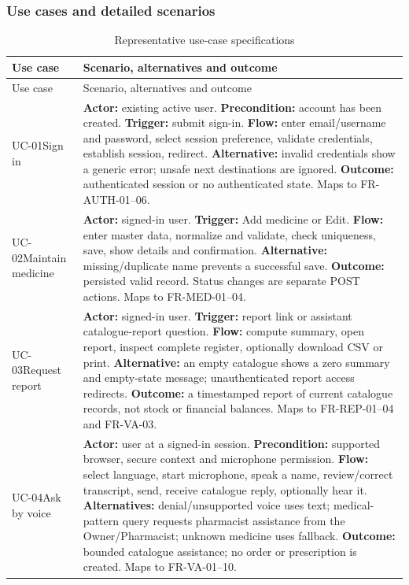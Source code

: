 \documentclass{article}
\begin{document}
\subsubsection{Use cases and detailed scenarios}
\begin{longtable}{L{26mm}L{121mm}}
\caption{Representative use-case specifications}\\
\toprule Use case & Scenario, alternatives and outcome\\\midrule\endfirsthead
\toprule Use case & Scenario, alternatives and outcome\\\midrule\endhead
\bottomrule\endfoot
UC-01\newline Sign in & \textbf{Actor:} existing active user. \textbf{Precondition:} account has been created. \textbf{Trigger:} submit sign-in. \textbf{Flow:} enter email/username and password, select session preference, validate credentials, establish session, redirect. \textbf{Alternative:} invalid credentials show a generic error; unsafe next destinations are ignored. \textbf{Outcome:} authenticated session or no authenticated state. Maps to FR-AUTH-01--06.\\
UC-02\newline Maintain medicine & \textbf{Actor:} signed-in user. \textbf{Trigger:} Add medicine or Edit. \textbf{Flow:} enter master data, normalize and validate, check uniqueness, save, show details and confirmation. \textbf{Alternative:} missing/duplicate name prevents a successful save. \textbf{Outcome:} persisted valid record. Status changes are separate POST actions. Maps to FR-MED-01--04.\\
UC-03\newline Request report & \textbf{Actor:} signed-in user. \textbf{Trigger:} report link or assistant catalogue-report question. \textbf{Flow:} compute summary, open report, inspect complete register, optionally download CSV or print. \textbf{Alternative:} an empty catalogue shows a zero summary and empty-state message; unauthenticated report access redirects. \textbf{Outcome:} a timestamped report of current catalogue records, not stock or financial balances. Maps to FR-REP-01--04 and FR-VA-03.\\
UC-04\newline Ask by voice & \textbf{Actor:} user at a signed-in session. \textbf{Precondition:} supported browser, secure context and microphone permission. \textbf{Flow:} select language, start microphone, speak a name, review/correct transcript, send, receive catalogue reply, optionally hear it. \textbf{Alternatives:} denial/unsupported voice uses text; medical-pattern query requests pharmacist assistance from the Owner/Pharmacist; unknown medicine uses fallback. \textbf{Outcome:} bounded catalogue assistance; no order or prescription is created. Maps to FR-VA-01--10.\\

\end{longtable}
\end{document}
